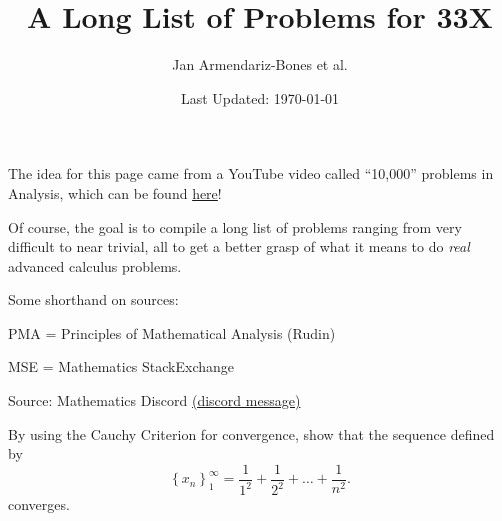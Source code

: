 \documentclass[letterpaper,twoside]{book}
\title{A Long List of Problems for 33X}
\author{Jan Armendariz-Bones et al.}
\date{Last Updated: \today}
\begin{document}
{\let\newpage\relax\maketitle}
\maketitle
The idea for this page came from a YouTube video called ``10,000'' problems in Analysis, which can be found \href{https://youtu.be/3mvNug_YM-g?si=9sa2EVkcANsY7IBk}{here}!

Of course, the goal is to compile a long list of problems ranging from very difficult to near trivial, all to get a better grasp of what it means to do \emph{real} advanced calculus problems.

Some shorthand on sources:

\noindent PMA = Principles of Mathematical Analysis (Rudin)

\noindent MSE = Mathematics StackExchange
\newpage
\begin{que}
		Source: Mathematics Discord \href{https://discord.com/channels/268882317391429632/576508782637744130/1169106442435969094}{(discord message)}

		By using the Cauchy Criterion for convergence, show that the sequence defined by \[\left\{x_n\right\}_1^\infty=\frac{1}{1^2}	+ \frac{1}{2^2}	+ \dots + \frac{1}{n^2}.\] converges.
\end{que}	
\end{document}
